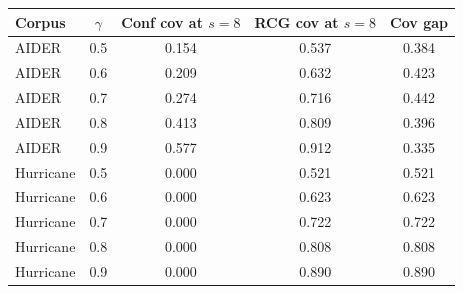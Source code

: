\begin{tabular}{lcccc}
\toprule
Corpus & $\gamma$ & Conf cov at $s{=}8$ & RCG cov at $s{=}8$ & Cov gap \\
\midrule
AIDER & 0.5 & 0.154 & 0.537 & 0.384\\
AIDER & 0.6 & 0.209 & 0.632 & 0.423\\
AIDER & 0.7 & 0.274 & 0.716 & 0.442\\
AIDER & 0.8 & 0.413 & 0.809 & 0.396\\
AIDER & 0.9 & 0.577 & 0.912 & 0.335\\
Hurricane & 0.5 & 0.000 & 0.521 & 0.521\\
Hurricane & 0.6 & 0.000 & 0.623 & 0.623\\
Hurricane & 0.7 & 0.000 & 0.722 & 0.722\\
Hurricane & 0.8 & 0.000 & 0.808 & 0.808\\
Hurricane & 0.9 & 0.000 & 0.890 & 0.890\\
\bottomrule
\end{tabular}
